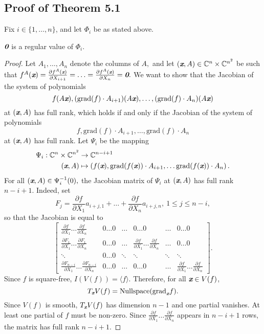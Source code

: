 \documentclass[sigconf]{acmart}
\def\bz{\textit{\textbf{0}}}
\def\xb{\textit{\textbf{x}}}
\def\C{\mathbb{C}}
\def\grad{\textrm{grad}}
\def\pa{\partial}
\begin{document}
\subsection{Proof of Theorem 5.1}
%
Fix $i \in \{1,\hdots,n\}$, and let $\Phi_i$ be as stated above.
%
\begin{proposition} 
$\bz$ is a regular value of $\Phi_i$.
\end{proposition}
%
\begin{proof}
Let $A_1,\hdots,A_n$ denote the columns of $A,$ and let $(\xb,A) \in \C^n \times \C^{n^2}$ be such that 
$f^A(\xb) = \frac{\partial f^A(\xb)}{\partial X_{i+1}}=\hdots= \frac{\partial f^A(\xb)}{\partial X_n}=\bz.$
We want to show that the Jacobian of the system of polynomials 
\[
f(A\xb),(\grad(f)\cdot A_{i+1})(A\xb),\hdots, (\grad(f)\cdot A_n)(A\xb)
\]
at $(\xb,A)$ has full rank, which holds if and only if the Jacobian of the system of polynomials 
\[
f,\grad(f)\cdot A_{i+1},\hdots, \grad(f)\cdot A_n
\]
at $(\xb,A)$ has full rank. Let $\Psi_i$ be the mapping
%
\begin{align*}
    \Psi_i: \C^n \times \C^{n^2} &\rightarrow \C^{n-i+1} \\
       (\xb,A) &\mapsto 
       \left(f(\xb),\grad(f(\xb))\cdot 
A_{i+1},\hdots
\grad(f(\xb))\cdot 
A_{n}
\right).
\end{align*}
%
For all $(\xb,A) \in \Psi_i^{-1}(0),$ the Jacobian matrix of $\Psi_i$ at $(\xb,A)$ has full rank $n-i+1$. Indeed, set 
\[
F_j = \frac{\pa f}{\pa X_1} a_{i+j,1} + \hdots + \frac{\pa f}{\pa X_n}a_{i+j,n}, ~1 \leq j \leq n-i,
\]
so that the Jacobian is equal to
\[
\left[ 
\begin{array}{cccccc}
\frac{\pa f}{\pa X_1} \hdots \frac{\pa f}{\pa X_n}            &0\hdots 0&\hdots& 0 \hdots 0                                         & \hdots & 0\hdots 0 \\ 
\frac{\pa F_{1}}{\pa X_1}\hdots \frac{\pa F_{1}}{\pa X_n}     &0\hdots 0&\hdots& \frac{\pa f}{\pa X_1} \hdots \frac{\pa f}{\pa X_n} & \hdots & 0\hdots 0 \\
\ddots                                                        &0\hdots 0&\ddots&\ddots                                              & \ddots & \ddots \\
\frac{\pa F_{n-i}}{\pa X_1}\hdots \frac{\pa F_{n-i}}{\pa X_n} &0\hdots 0&\hdots&0 \hdots 0&  \hdots & \frac{\pa f}{\pa X_1} \hdots \frac{\pa f}{\pa X_n}  
\end{array}
\right]. 
\] 
Since $f$ is square-free, $I(V(f)) = \langle f \rangle.$ Therefore, for all $\xb \in V(f)$, 
\[
T_{\xb} V(f) = \textrm{Nullspace}(\grad_{\xb} f).
\]
Since $V(f)$ is smooth, $T_{\xb} V(f)$ has dimension $n-1$ and one partial vanishes. At least one partial of $f$ must be non-zero. Since  $\frac{\pa f}{\pa X_1} \hdots \frac{\pa f}{\pa X_n}$ appears in $n-i+1$ rows, the matrix has full rank $n-i+1$.
\end{proof}
\end{document}
